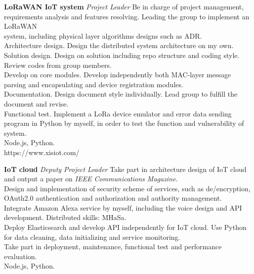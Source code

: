 \documentclass[10pt]{article} %
\newcommand{\red}[1]{{\color{headings}{#1}}}
\begin{document}
\begin{paracol}{2}
{} %
{\textbf{LoRaWAN IoT system}} %
{\textit{Project Leader}} %
{\red{1.} Be in charge of project management, requirements analysis and features resolving. Leading the group to implement an LoRaWAN\texttrademark\\ system, including physical layer algorithms designs such as ADR.\\
\red{2.} Architecture design. Design the distributed system architecture on my own.\\
\red{3.} Solution design. Design on solution including repo structure and coding style. Review codes from group members.\\
\red{4.} Develop on core modules. Develop independently both MAC-layer message parsing and encapsulating and device registration modules.\\
\red{5.} Documentation. Design document style individually. Lead group to fulfill the document and revise.\\
\red{6.} Functional test. Implement a LoRa device emulator and error data sending program in Python by myself, in order to test the function and vulnerability of system.\\
\red{Major developing language:} Node.js, Python.\\
\red{Product:} https://www.xisiot.com/
} %
\red{\par\noindent\rule{0.48\textwidth}{0.4pt}}

{} %
{\textbf{IoT cloud}} %
{\textit{Deputy Project Leader}} %
{\red{1.} Take part in architecture design of IoT cloud and output a paper on \emph{IEEE Communications Magazine}.\\
\red{2.} Design and implementation of security scheme of services, such as de/encryption, OAuth2.0 authentication and authorization and authority management.\\
\red{3.} Integrate \faAmazon Amazon Alexa service by myself, including the voice design and API development. Distributed skills: MHaSa.\\
\red{4.} Deploy Elasticsearch and develop API independently for IoT cloud. Use Python for data cleaning, data initializing and service monitoring.\\
\red{5.} Take part in deployment, maintenance, functional test and performance evaluation.\\
\red{Major developing language:} Node.js, Python.}  %
\red{\par\noindent\rule{0.48\textwidth}{0.4pt}}


\end{paracol}
\end{document}
